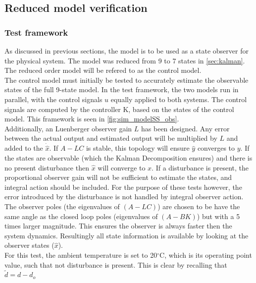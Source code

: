 \subsection{Reduced model verification}
\subsubsection{Test framework}
As discussed in previous sections, the model is to be used as a state observer for the physical system. The model was reduced from 9 to 7 states in \cref{sec:kalman}. The reduced order model will be refered to as the control model. \\

The control model must initially be tested to accurately estimate the observable states of the full 9-state model. In the test framework, the two models run in parallel, with the control signals $u$ equally applied to both systems. The control signals are computed by the controller K, based on the states of the control model. This framework is seen in \cref{fig:sim_modelSS_obs}. \\

Additionally, an Luenberger observer gain $L$ has been designed. Any error between the actual output and estimated output will be multiplied by $L$ and added to the $\dot{\hat{x}}$. If $A-LC$ is stable, this topology will ensure $\hat{y}$ converges to $y$. If the states are observable (which the Kalman Decomposition ensures) and there is no present disturbance then $\hat{x}$ will converge to $x$. If a disturbance is present, the proportional observer gain will not be sufficient to estimate the states, and integral action should be included. For the purpose of these tests however, the error introduced by the disturbance is not handled by integral observer action. \\

The observer poles (the eigenvalues of $(A-LC)$) are chosen to be have the same angle as the closed loop poles (eigenvalues of $(A-BK)$) but with a 5 times larger magnitude. This ensures the observer is always faster then the system dynamics. Resultingly all state information is available by looking at the observer states ($\hat{x}$).\\

For this test, the ambient temperature is set to 20$^{\circ}$C, which is its operating point value, such that not disturbance is present. This is clear by recalling that $\tilde{d} = d-d_o$

